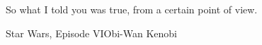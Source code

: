 \preface

So what I told you was true, from a certain point of view.

\vspace{1cm}
\begin{flushright}\noindent
Star Wars, Episode VI\hfill {Obi-Wan Kenobi}\\
\end{flushright}
